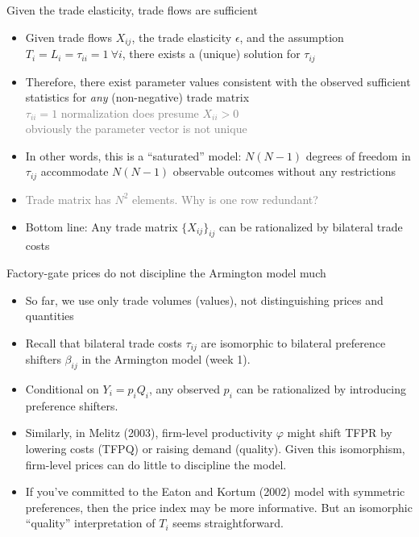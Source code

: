 \documentclass[11pt,notes=hide,aspectratio=169]{beamer}
\begin{document}
\begin{frame}{Given the trade elasticity, trade flows are sufficient}
\begin{itemize}
\item
Given trade flows $X_{ij}$, the trade elasticity $\epsilon$, and
the assumption $T_i = L_i = \tau_{ii} = 1 \ \forall i$,
there exists a (unique) solution for $\tau_{ij}$
\item
Therefore,
there exist parameter values consistent with the observed sufficient statistics
for \textit{any} (non-negative) trade matrix
\\ \textcolor{gray}{$\tau_{ii} = 1$ normalization does presume $X_{ii} > 0$ \\ obviously the parameter vector is not unique}
\item
In other words, this is a ``saturated'' model:
$N(N-1)$ degrees of freedom in $\tau_{ij}$
accommodate $N(N-1)$ observable outcomes
without any restrictions
\item[] \textcolor{gray}{Trade matrix has $N^2$ elements. Why is one row redundant?}
\item 
Bottom line: Any trade matrix $\{X_{ij}\}_{ij}$ can be rationalized by bilateral trade costs
\end{itemize}
\end{frame}
\begin{frame}{Factory-gate prices do not discipline the Armington model much}
\begin{itemize}
\item
So far, we use only trade volumes (values), not distinguishing prices and quantities
\item
Recall that bilateral trade costs $\tau_{ij}$ are isomorphic to bilateral preference shifters $\beta_{ij}$ in the Armington model (week 1).
\item
Conditional on $Y_i = p_i Q_i$, any observed $p_i$ can be rationalized by introducing preference shifters.
\item
Similarly, in Melitz (2003), firm-level productivity $\varphi$ might shift TFPR by lowering costs (TFPQ) or raising demand (quality).
Given this isomorphism, firm-level prices can do little to discipline the model.
\item
If you've committed to the Eaton and Kortum (2002) model with symmetric preferences,
then the price index may be more informative.
But an isomorphic ``quality'' interpretation of $T_i$ seems straightforward.
\end{itemize}
\end{frame}
\end{document}
